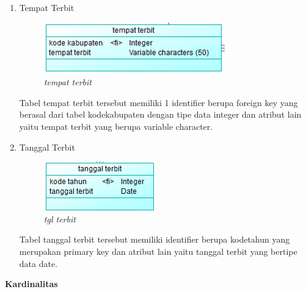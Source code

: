 \documentclass[12pt,a4paper,bahasa]{article}
\begin{document}
\begin{enumerate}
\item Tempat Terbit\\
\begin{figure}[!htbp]
\centering
\includegraphics[scale=1.5]{gambar/tempatterbit.png}
\caption{\textit{tempat terbit}}
\label{tmptterbit}
\end{figure}
Tabel tempat terbit tersebut memiliki 1 identifier berupa foreign key yang berasal dari tabel kodekabupaten dengan tipe data integer dan atribut lain yaitu tempat terbit yang berupa variable character.

\item Tanggal Terbit \\
\begin{figure}[!htbp]
\centering
\includegraphics[scale=1.5]{gambar/tglterbit.png}
\caption{\textit{tgl terbit}}
\label{tglterbit}
\end{figure}
Tabel tanggal terbit tersebut memiliki identifier berupa kodetahun yang merupakan primary key dan atribut lain yaitu tanggal terbit yang bertipe data date.
	
	\end{enumerate}
	
\textbf{Kardinalitas}
\end{document}
